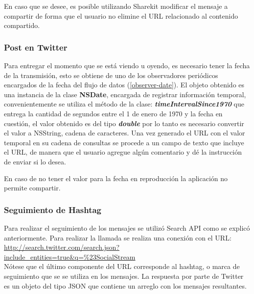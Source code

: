 En caso que se desee, es posible utilizando Sharekit modificar el mensaje a compartir de forma que el usuario no elimine el URL relacionado al contenido compartido.

		\subsubsection{Post en Twitter}
		Para entregar el momento que se está viendo u oyendo, es necesario tener la fecha de la transmisión, esto se obtiene de uno de los observadores periódicos encargados de la fecha del flujo de datos (\ref{observer-date}). El objeto obtenido es una instancia de la clase \textbf{NSDate}, encargada de registrar información temporal, convenientemente se utiliza el método de la clase: \textit{\textbf{timeIntervalSince1970}} que entrega la cantidad de segundos entre el 1 de enero de 1970 y la fecha en cuestión, el valor obtenido es del tipo \textbf{\textit{double}} por lo tanto es necesario convertir el valor a NSString, cadena de caracteres. Una vez generado el URL con el valor temporal en su cadena de consultas se procede a un campo de texto que incluye el URL, de manera que el usuario agregue algún comentario y dé la instrucción de enviar si lo desea.
		
		
		En caso de no tener el valor para la fecha en reproducción la aplicación no permite compartir.

		\subsubsection{Seguimiento de Hashtag}
		Para realizar el seguimiento de los mensajes se utilizó Search API como se explicó anteriormente. Para realizar la llamada se realiza una conexión con el URL: 
\url{http://search.twitter.com/search.json?include_entities=true&q=%23SocialStream} \\
		
		Nótese que el último componente del URL corresponde al hashtag, o marca de seguimiento que se se utiliza en los mensajes. La respuesta por parte de Twitter es un objeto del tipo JSON que contiene un arreglo con los mensajes resultantes.

